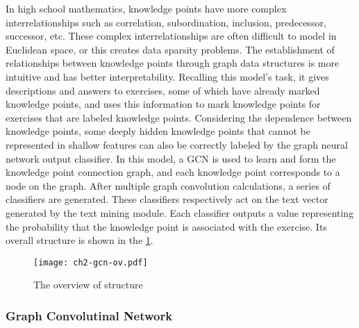 In high school mathematics, knowledge points have more complex interrelationships such as correlation, subordination, inclusion, predecessor, successor, etc. These complex interrelationships are often difficult to model in Euclidean space, or this creates data sparsity problems. The establishment of relationships between knowledge points through graph data structures is more intuitive and has better interpretability. Recalling this model's task, it gives descriptions and answers to exercises, some of which have already marked knowledge points, and uses this information to mark knowledge points for exercises that are labeled knowledge points. Considering the dependence between knowledge points, some deeply hidden knowledge points that cannot be represented in shallow features can also be correctly labeled by the graph neural network output classifier. In this model, a GCN is used to learn and form the knowledge point connection graph, and each knowledge point corresponds to a node on the graph. After multiple graph convolution calculations, a series of classifiers are generated. These classifiers respectively act on the text vector generated by the text mining module. Each classifier outputs a value representing the probability that the knowledge point is associated with the exercise. Its overall structure is shown in the \figurename{\ref{fig:ch2-gcn-ov}}.

\begin{figure}[H]
	\centering
	\texttt{[image: ch2-gcn-ov.pdf]}
	\caption{The overview of structure}\label{fig:ch2-gcn-ov}
\end{figure}



\subsubsection{Graph Convolutinal Network}

